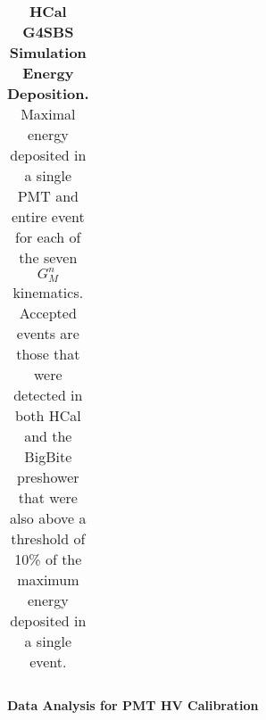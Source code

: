 \documentclass[10pt]{article}
\begin{document}
\begin{table}[!ht]
\begin{tabular}{|c|ccccccccc|}
	\hline
	\end{tabular}
	\caption{{\bf{HCal G4SBS Simulation Energy Deposition.}} Maximal energy deposited in a single PMT and entire event for each of the seven $G_M^n$ kinematics. Accepted events are those that were detected in both HCal and the BigBite preshower that were also above a threshold of 10\% of the maximum energy deposited in a single event.} %
	\label{tab:edep}
	\end{table}
	
{\large \noindent \bf{Data Analysis for PMT HV Calibration}}
\vspace{3mm}
	
\end{document}
